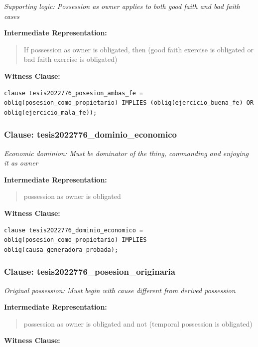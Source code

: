 \documentclass[11pt,a4paper]{article}
\begin{document}
\textit{Supporting logic: Possession as owner applies to both good faith and bad faith cases}

\textbf{Intermediate Representation:}

\begin{quote}
If possession as owner is obligated, then (good faith exercise is obligated or bad faith exercise is obligated)
\end{quote}

\textbf{Witness Clause:}

\begin{lstlisting}[style=witnessstyle, language=Witness]
clause tesis2022776_posesion_ambas_fe = oblig(posesion_como_propietario) IMPLIES (oblig(ejercicio_buena_fe) OR oblig(ejercicio_mala_fe));
\end{lstlisting}

\subsubsection{Clause: tesis2022776\_dominio\_economico}

\textit{Economic dominion: Must be dominator of the thing, commanding and enjoying it as owner}

\textbf{Intermediate Representation:}

\begin{quote}
possession as owner is obligated
\end{quote}

\textbf{Witness Clause:}

\begin{lstlisting}[style=witnessstyle, language=Witness]
clause tesis2022776_dominio_economico = oblig(posesion_como_propietario) IMPLIES oblig(causa_generadora_probada);
\end{lstlisting}

\subsubsection{Clause: tesis2022776\_posesion\_originaria}

\textit{Original possession: Must begin with cause different from derived possession}

\textbf{Intermediate Representation:}

\begin{quote}
possession as owner is obligated and not (temporal possession is obligated)
\end{quote}

\textbf{Witness Clause:}
\end{document}
